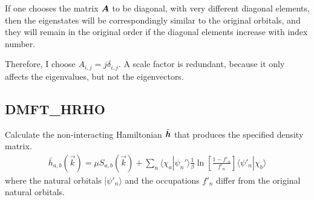 \documentclass[11pt,a4paper]{report}
\begin{document}
If one chooses the matrix $\bm{A}$ to be diagonal, with very
different diagonal elements, then the eigenstates will be
correspondingly similar to the original orbitals, and they will remain
in the original order if the diagonal elements increase with index
number.

Therefore, I choose $A_{i,j}=j\delta_{i,j}$. A scale factor is
redundant, because it only affects the eigenvalues, but not the
eigenvectors.


\subsection{DMFT\_HRHO}
\label{sec:routinedmfthrho}
Calculate the non-interacting Hamiltonian $\bar{\bm{h}}$ that
produces the specified density matrix.
\begin{eqnarray}
\bar{h}_{a,b}(\vec{k})=\mu S_{a,b}(\vec{k})+\sum_n\langle\chi_a|\psi_n'\rangle
\frac{1}{\beta}\ln\left[\frac{1-f'_n}{f'_n}\right]
\langle\psi'_n|\chi_b\rangle
\end{eqnarray}
where the natural orbitals $|\psi'_n\rangle$ and the occupations
$f'_n$ differ from the original natural orbitals.
\end{document}

